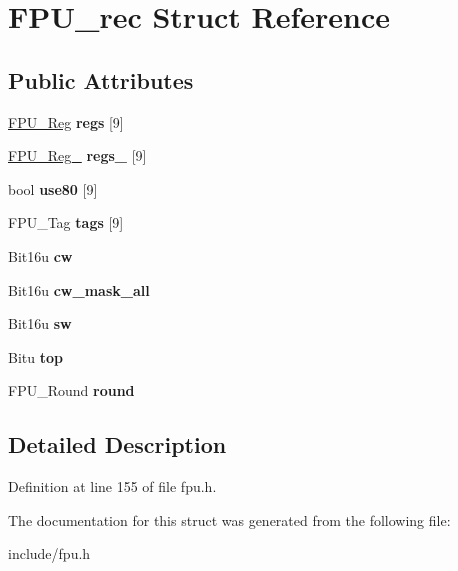 \hypertarget{structFPU__rec}{\section{F\-P\-U\-\_\-rec Struct Reference}
\label{structFPU__rec}
}
\subsection*{Public Attributes}
\begin{DoxyCompactItemize}
\item 
\hypertarget{structFPU__rec_aff91340488ae11369f5f67d414cfcd3f}{\hyperlink{unionFPU__Reg}{F\-P\-U\-\_\-\-Reg} {\bfseries regs} \mbox{[}9\mbox{]}}\label{structFPU__rec_aff91340488ae11369f5f67d414cfcd3f}

\item 
\hypertarget{structFPU__rec_a4cc16cfe7ad0e6573f20468e0dfc2cb2}{\hyperlink{unionFPU__Reg__80}{F\-P\-U\-\_\-\-Reg\-\_} {\bfseries regs\-\_} \mbox{[}9\mbox{]}}\label{structFPU__rec_a4cc16cfe7ad0e6573f20468e0dfc2cb2}

\item 
\hypertarget{structFPU__rec_a974aaaae541689997b1abc150447a381}{bool {\bfseries use80} \mbox{[}9\mbox{]}}\label{structFPU__rec_a974aaaae541689997b1abc150447a381}

\item 
\hypertarget{structFPU__rec_a5c968eb9b019de7d023d7a04eeba543a}{F\-P\-U\-\_\-\-Tag {\bfseries tags} \mbox{[}9\mbox{]}}\label{structFPU__rec_a5c968eb9b019de7d023d7a04eeba543a}

\item 
\hypertarget{structFPU__rec_a2e577292d3ea233f39af491ae84dce91}{Bit16u {\bfseries cw}}\label{structFPU__rec_a2e577292d3ea233f39af491ae84dce91}

\item 
\hypertarget{structFPU__rec_a79bb0307ec0aff5444c09d24220de9d7}{Bit16u {\bfseries cw\-\_\-mask\-\_\-all}}\label{structFPU__rec_a79bb0307ec0aff5444c09d24220de9d7}

\item 
\hypertarget{structFPU__rec_a2c55462f6b2e5cffdd65018b8d705897}{Bit16u {\bfseries sw}}\label{structFPU__rec_a2c55462f6b2e5cffdd65018b8d705897}

\item 
\hypertarget{structFPU__rec_af259b7d483635771144a43ed0e381214}{Bitu {\bfseries top}}\label{structFPU__rec_af259b7d483635771144a43ed0e381214}

\item 
\hypertarget{structFPU__rec_a624978ca4690aebef50e4ae884e77b86}{F\-P\-U\-\_\-\-Round {\bfseries round}}\label{structFPU__rec_a624978ca4690aebef50e4ae884e77b86}

\end{DoxyCompactItemize}


\subsection{Detailed Description}


Definition at line 155 of file fpu.\-h.



The documentation for this struct was generated from the following file\-:\begin{DoxyCompactItemize}
\item 
include/fpu.\-h\end{DoxyCompactItemize}

